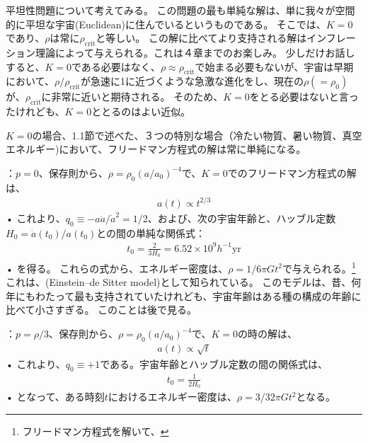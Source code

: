 \documentclass[11pt,a4paper,dvipdfmx]{jsarticle}
\theoremstyle{plain}
\theoremstyle{break}
\begin{document}
平坦性問題について考えてみる。
この問題の最も単純な解は、単に我々が空間的に平坦な宇宙(Euclidean)に住んでいるというものである。%
そこでは、$K=0$であり、$\rho$は常に$\rho_{\text{crit}}$と等しい。%
この解に比べてより支持される解はインフレーション理論によって与えられる。これは４章までのお楽しみ。
少しだけお話しすると、$K = 0$である必要はなく、$\rho \approx \rho_{\text{crit}}$で始まる必要もないが、宇宙は早期において、$\rho/\rho_{\text{crit}}$が急速に1に近づくような急激な進化をし、現在の$\rho( =\rho_{0} )$が、$\rho_{\text{crit}}$に非常に近いと期待される。%
そのため、$K=0$をとる必要はないと言ったけれども、$K=0$ととるのはよい近似。

$K=0$の場合、1.1節で述べた、３つの特別な場合（冷たい物質、暑い物質、真空エネルギー)において、フリードマン方程式の解は常に単純になる。

\noindent
{}：$p = 0$、保存則から、$\rho=\rho_{0}\left(a / a_{0}\right)^{-4}$で、$K=0$でのフリードマン方程式の解は、
\begin{align*}
  a(t) \propto t^{2 / 3}
\end{align*}•%
これより、$ q_{0} \equiv-a \ddot{a} / \dot{a}^{2}=1 / 2 $、および、次の宇宙年齢と、ハッブル定数$H_0 = \dot{a}(t_0)/a(t_0)$との間の単純な関係式：
\begin{align}
  t_{0}=\frac{2}{3 H_{0}}=6.52 \times 10^{9} h^{-1} \mathrm{yr}
\end{align}•%
を得る。
これらの式から、エネルギー密度は、$\rho = 1/6\pi G t^2$で与えられる。\footnote{フリードマン方程式を解いて、}
これは、(Einstein–de Sitter model)として知られている。
このモデルは、昔、何年にもわたって最も支持されていたけれども、宇宙年齢はある種の構成の年齢に比べて小さすぎる。
このことは後で見る。
\vspace{0.8pt}

\noindent
{}：$p = \rho/3$、保存則から、$\rho=\rho_{0}\left(a / a_{0}\right)^{-4} $で、$K=0$の時の解は、
\begin{align}
  a(t) \propto \sqrt{t}
\end{align}•%
これより、$ q_{0} \equiv  +1 $である。宇宙年齢とハッブル定数の間の関係式は、
\begin{align}
  t_0 = \frac{1}{2 H_0}
\end{align}•%
となって、ある時刻$t$におけるエネルギー密度は、$\rho = 3/32\pi G t^2 $となる。
\vspace{0.8pt}
\end{document}
